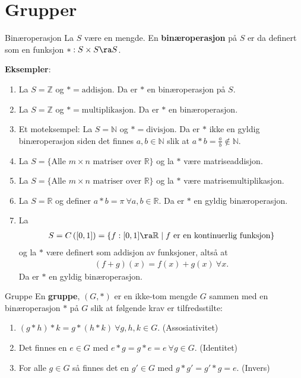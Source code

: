\section{Grupper}

\begin{definition}{Binæroperasjon}{}
	La $S$ være en mengde. En \textbf{binæroperasjon} på $S$ er da definert som en funksjon
	$*: S\times S \ra S$.
\end{definition}

\textbf{Eksempler}:
\begin{enumerate}
	\item La $S = \mathbb{Z}$ og $* = \text{addisjon}$. Da er $*$ en binæroperasjon
	      på $S$.
	\item La $S = \mathbb{Z}$ og $* = \text{multiplikasjon}$. Da er $*$ en binæroperasjon.
	\item Et moteksempel: La $S = \mathbb{N}$ og $* = \text{divisjon}$. Da er $*$ ikke
	      en gyldig binæroperasjon siden det finnes $a, b \in \mathbb{N}$ slik at
	      $a * b = \frac{a}{b} \not \in \mathbb{N}$.
	\item La $S = \{ \text{Alle } m\times n \text{ matriser over }\mathbb{R}\}$ og la
	      $*$ være matriseaddisjon.
	\item La $S = \{ \text{Alle } m\times n \text{ matriser over }\mathbb{R}\}$ og la
	      $*$ være matrisemultiplikasjon.
	\item La $S = \mathbb{R}$ og definer $a*b = \pi \ \forall a,b \in \mathbb{R}$. Da
	      er $*$ en gyldig binæroperasjon.
	\item La
	      \begin{align}
		      S = C\left( \left[0, 1\right] \right) =
		      \left\{f: [0, 1]\ra \mathbb{R}\mid f \text{ er en kontinuerlig funksjon}\right\}
	      \end{align}
	      og la $*$ være definert som addisjon av funksjoner, altså at
	      \begin{align}
		      (f + g)(x) = f(x) + g(x)\ \forall x.
	      \end{align}
	      Da er $*$ en gyldig binæroperasjon.
\end{enumerate}

\begin{definition}{Gruppe}{}
	En \textbf{gruppe}, $(G, *)$ er en ikke-tom mengde $G$ sammen med en binæroperasjon
	$*$ på $G$ slik at følgende krav er tilfredsstilte:
	\begin{enumerate}[label=$\mathscr{G}$\arabic*)]
		\item $(g*h)*k = g*(h*k)\ \forall g, h, k \in G$. (Assosiativitet)
		\item Det finnes en $e \in G$ med $e*g = g*e = e\ \forall g\in G$. (Identitet)
		\item For alle $g\in G$ så finnes det en $g'\in G$ med $g*g'=g'*g = e$. (Invers)
	\end{enumerate}
\end{definition}

